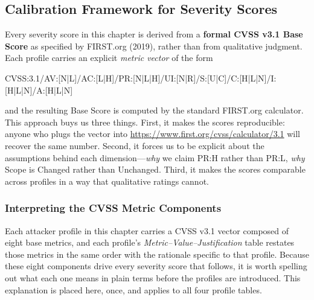 \subsection{Calibration Framework for Severity Scores}
\label{ch3:sec:cvss-framework}

Every severity score in this chapter is derived from a \textbf{formal CVSS
v3.1 Base Score} as specified by FIRST.org (2019), rather than from qualitative
judgment. Each profile carries an explicit \emph{metric vector} of the form

\begin{center}
{\ttfamily\scriptsize CVSS:3.1/AV:[N|L]/AC:[L|H]/PR:[N|L|H]/UI:[N|R]/S:[U|C]/C:[H|L|N]/I:[H|L|N]/A:[H|L|N]}
\end{center}

and the resulting Base Score is computed by the standard FIRST.org
calculator. This approach buys us three things. First, it makes the
scores reproducible: anyone who plugs the vector into
\url{https://www.first.org/cvss/calculator/3.1} will recover the same
number. Second, it forces us to be explicit about the assumptions behind
each dimension---\emph{why} we claim PR:H rather than PR:L, \emph{why}
Scope is Changed rather than Unchanged. Third, it makes the scores
comparable across profiles in a way that qualitative ratings cannot.

\subsubsection{Interpreting the CVSS Metric Components}
\label{ch3:sec:cvss-metrics-explained}

Each attacker profile in this chapter carries a CVSS v3.1 vector composed
of eight base metrics, and each profile's \emph{Metric--Value--Justification}
table restates those metrics in the same order with the rationale specific
to that profile. Because these eight components drive every severity score
that follows, it is worth spelling out what each one means in plain terms
before the profiles are introduced. This explanation is placed here, once,
and applies to all four profile tables.

